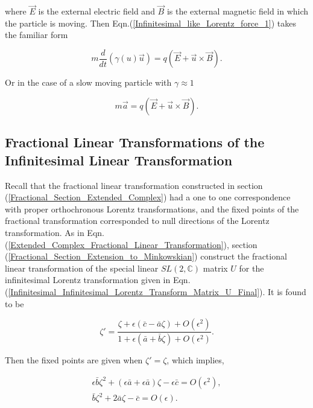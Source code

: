 \noindent where $\vec{E}$ is the external electric field and $\vec{B}$ is the external magnetic field in which the particle is moving. Then Eqn.(\ref{Infinitesimal_like_Lorentz_force_1}) takes the familiar form

\begin{equation*}
m \frac{d}{dt} (\gamma(u) \vec{u}) = q(\vec{E} + \vec{u} \times \vec{B}).
\end{equation*}

\noindent Or in the case of a slow moving particle with  $\gamma \approx 1$ 

\begin{equation*}  
m \vec{a} = q (\vec{E} + \vec{u} \times \vec{B}).
\end{equation*}  

\subsection{Fractional Linear Transformations of the Infinitesimal Linear Transformation}\label{Infinitesimal_Section_Fractional_Linear}

Recall that the fractional linear transformation constructed in section (\ref{Fractional_Section_Extended_Complex}) had a one to one correspondence with proper orthochronous Lorentz transformations, and the fixed points of the fractional transformation corresponded to null directions of the Lorentz transformation. As in Eqn.(\ref{Extended_Complex_Fractional_Linear_Transformation}), section (\ref{Fractional_Section_Extension_to_Minkowskian}) construct the fractional linear transformation of the special linear $SL(2, \mathbb{C})$ matrix $U$ for the infinitesimal Lorentz transformation given in Eqn.(\ref{Infinitesimal_Infinitesimal_Lorentz_Transform_Matrix_U_Final}). It is found to be

\begin{equation*}   
\zeta' = \frac{\zeta + \epsilon(\bar{c} - \bar{a}\zeta) + O(\epsilon^2)}{1 + \epsilon(\bar{a} + \bar{b} \zeta) + O(\epsilon^2)}.
\end{equation*}

\noindent Then the fixed points are given when $\zeta' = \zeta$, which implies,

\begin{gather}\nonumber
\epsilon \bar{b} \zeta^2 + (\epsilon \bar{a} + \epsilon \bar{a})\zeta - \epsilon \bar{c} = O(\epsilon^2), \\ \label{Infinitesimal_fixed_point_quadratic}
\bar{b} \zeta^2 + 2 \bar{a} \zeta - \bar{c} = O(\epsilon).
\end{gather}

